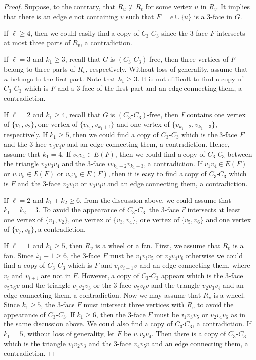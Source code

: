 \documentclass[12pt]{article}
\begin{document}
\begin{proof}
    Suppose, to the contrary, that $R_u\not\subseteq R_v$ for some vertex $u$ in $R_v$. 
    It implies that there is an edge $e$ not containing $v$ such that $F=e\cup \{u\}$ is a $3$-face in $G$.

    If $\ell\geq 4$, then we could easily find a copy of $C_3\text{-}C_3$ since the $3$-face $F$ intersects at most three parts of $R_v$, a contradiction.

    If $\ell=3$ and $k_1\geq 3$, recall that $G$ is $(C_3\text{-}C_3)$-free, then three vertices of $F$ belong to three parts of $R_v$, respectively. Without loss of generality, assume that $u$ belongs to the first part. Note that $k_1\geq 3$. It is not difficult to find a copy of $C_3\text{-}C_3$ which is $F$ and a $3$-face of the first part and an edge connecting them, a contradiction.

    If $\ell=2$ and $k_1\geq 4$, recall that $G$ is $(C_3\textbf{-}C_3)$-free, then $F$ contains one vertex of $\{v_1,v_2\}$, one vertex of $\{v_{k_1},v_{k_1+1}\}$ and one vertex of $\{v_{k_1+2},v_{k_1+3}\}$, respectively.
    If $k_1\geq 5$, then we could find a copy of $C_3\textbf{-}C_3$ which is the $3$-face $F$ and the $3$-face $v_3v_4v$ and an edge connecting them, a contradiction.
    Hence, assume that $k_1=4$. If $v_2v_4\in E(F)$, then we could find a copy of $C_3\textbf{-}C_3$ between the triangle $v_2v_3v_4$ and the $3$-face $vv_{k_1+2}v_{k_1+3}$, a contradiction. If $v_1v_4\in E(F)$ or $v_1v_5\in E(F)$ or $v_2v_5\in E(F)$, then it is easy to find a copy of $C_3\textbf{-}C_3$ which is $F$ and the $3$-face $v_2v_3v$ or $v_3v_4v$ and an edge connecting them,  a contradiction.
    
    If $\ell=2$ and $k_1+k_2\geq 6$, from the discussion above, we could assume that $k_1=k_2=3$.
    To avoid the appearance of $C_3\textbf{-}C_3$, the $3$-face $F$ intersects at least one vertex of $\{v_1,v_2\}$, one vertex of $\{v_3,v_4\}$, one vertex of $\{v_5,v_6\}$ and one vertex of $\{v_7,v_8\}$, a contradiction. 

    If $\ell=1$ and $k_1\geq5$, then $R_v$ is a wheel or a fan. First, we assume that $R_v$ is a fan. Since $k_1+1\geq 6$, the $3$-face $F$ must be $v_1v_3v_5$ or $v_2v_4v_6$ otherwise we could find a copy of $C_3\textbf{-}C_3$ which is $F$ and $v_iv_{i+1}v$ and an edge connecting them, where $v_i$ and $v_{i+1}$ are not in $F$. However, a copy of $C_3\textbf{-}C_3$ appears which is the $3$-face $v_5v_6v$ and the triangle $v_1v_2v_3$ or  the $3$-face $v_5v_6v$ and the triangle $v_2v_3v_4$ and an edge connecting them, a contradiction.
    Now we may assume that $R_v$ is a wheel. Since $k_1\geq 5$, the $3$-face $F$ must intersect three vertices with $R_v$ to avoid the appearance of $C_3\textbf{-}C_3$. If $k_1\geq 6$, then the $3$-face $F$ must be $v_1v_3v_5$ or $v_2v_4v_6$ as in the same discussion above. We could also find a copy of $C_3\textbf{-}C_3$, a contradiction. If $k_1=5$, without loss of generality, let $F$ be $v_1v_3v_4$. Then there is a copy of $C_3\textbf{-}C_3$ which is the triangle $v_1v_2v_3$ and the $3$-face $v_4v_5v$ and an edge connecting them, a contradiction.
\end{proof}
\end{document}
